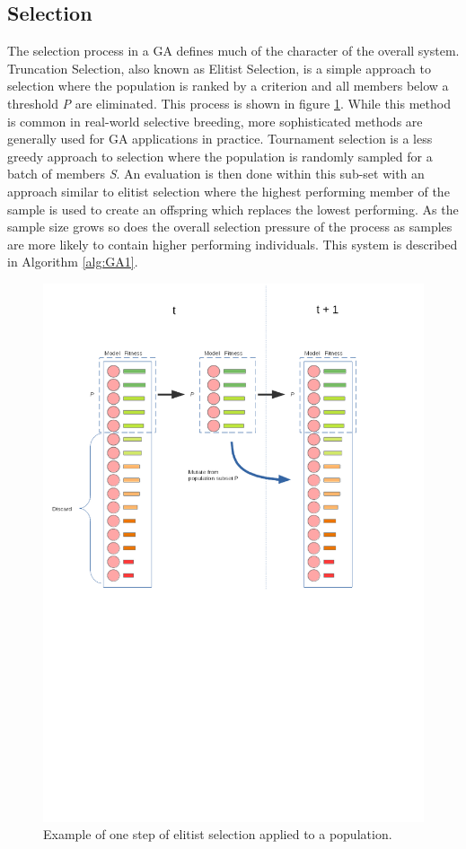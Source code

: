 \documentclass{article}
\begin{document}
\subsection {Selection}
	The selection process in a GA defines much of the character of the overall system.
	Truncation Selection, also known as Elitist Selection, is a simple approach to selection where the population is ranked by a criterion and all members below a threshold \textit{P} are eliminated.
	This process is shown in figure \ref{fig:GAX}. While this method is common in real-world selective breeding, more sophisticated methods are generally used for GA applications in practice.
	Tournament selection is a less greedy approach to selection where the population is randomly sampled for a batch of members \textit{S}.
	An evaluation is then done within this sub-set with an approach similar to elitist selection where the highest performing member of the sample is used to create an offspring which replaces the lowest performing.
	As the sample size grows so does the overall selection pressure of the process as samples are more likely to contain higher performing individuals. This system is described in Algorithm \ref{alg:GA1}.
	\begin{figure}[h]
	
		\centering 
		\includegraphics[trim= 100 450 100 0 ,scale=0.50]{Elite.png}


		\caption{Example of one step of elitist selection applied to a population.}
		\label{fig:GAX}


	\end{figure}
\end{document}
